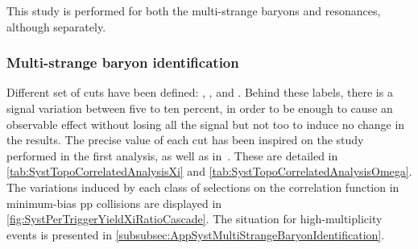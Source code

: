 This study is performed for both the multi-strange baryons and \rmPhiMes resonances, although separately.

\subsubsection{Multi-strange baryon identification}

Different set of cuts have been defined: , ,  and . Behind these labels, there is a signal variation between five to ten percent, in order to be  enough to cause an observable effect without losing all the signal but not too  to induce no change in the results. The precise value of each cut has been inspired on the study performed in the first analysis, as well as in~\cite{alicecollaborationMultiplicityDependenceMulti2020}. These are detailed in \tabs\ref{tab:SystTopoCorrelatedAnalysisXi} and \ref{tab:SystTopoCorrelatedAnalysisOmega}. The variations induced by each class of selections on the correlation function in minimum-bias pp collisions are displayed in \figs\ref{fig:SystPerTriggerYieldXiRatioCascade}. The situation for high-multiplicity events is presented in \appdx\ref{subsubsec:AppSystMultiStrangeBaryonIdentification}.

